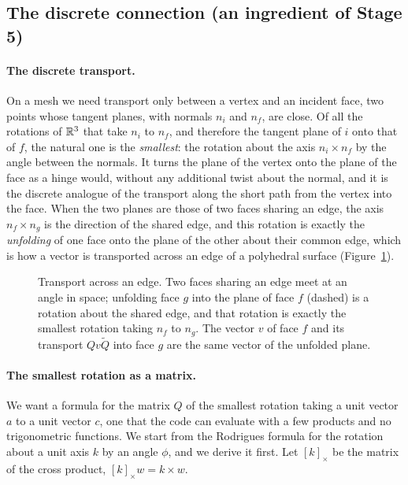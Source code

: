 \subsection{The discrete connection (an ingredient of Stage 5)}
\label{section:r1_discrete_connection}

\paragraph{The discrete transport.} On a mesh we need transport only between a vertex and an incident face, two points whose tangent planes, with normals $n_i$ and $n_f$, are close. Of all the rotations of $\mathbb{R}^3$ that take $n_i$ to $n_f$, and therefore the tangent plane of $i$ onto that of $f$, the natural one is the \emph{smallest}: the rotation about the axis $n_i \times n_f$ by the angle between the normals. It turns the plane of the vertex onto the plane of the face as a hinge would, without any additional twist about the normal, and it is the discrete analogue of the transport along the short path from the vertex into the face. When the two planes are those of two faces sharing an edge, the axis $n_f \times n_g$ is the direction of the shared edge, and this rotation is exactly the \emph{unfolding} of one face onto the plane of the other about their common edge, which is how a vector is transported across an edge of a polyhedral surface (Figure~\ref{fig:unfold}).
\begin{figure}[t]
\centering
{}
\caption{Transport across an edge. Two faces sharing an edge meet at an angle in space; unfolding face $g$ into the plane of face $f$ (dashed) is a rotation about the shared edge, and that rotation is exactly the smallest rotation taking $n_f$ to $n_g$. The vector $v$ of face $f$ and its transport $Q v \widetilde Q$ into face $g$ are the same vector of the unfolded plane.}
\label{fig:unfold}
\end{figure}

\paragraph{The smallest rotation as a matrix.} We want a formula for the matrix $Q$ of the smallest rotation taking a unit vector $a$ to a unit vector $c$, one that the code can evaluate with a few products and no trigonometric functions. We start from the Rodrigues formula for the rotation about a unit axis $k$ by an angle $\phi$, and we derive it first. Let $[k]_\times$ be the matrix of the cross product, $[k]_\times w = k\times w$.

